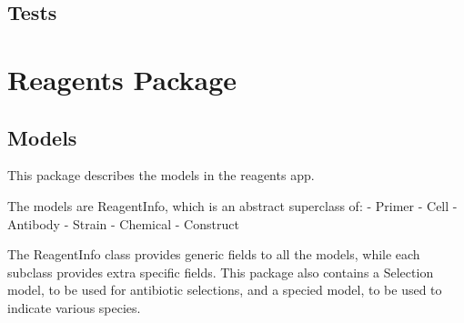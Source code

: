 \documentclass[letterpaper,10pt,english]{sphinxmanual}
\begin{document}
\subsection{Tests}
\label{api:id17}

\section{Reagents Package}
\label{api:module-experimentdb.reagents}\label{api:reagents-package}

\subsection{Models}
\label{api:id18}\label{api:module-experimentdb.reagents.models}
This package describes the models in the reagents app.

The models are ReagentInfo, which is an abstract superclass of:
- Primer
- Cell
- Antibody
- Strain
- Chemical
- Construct

The ReagentInfo class provides generic fields to all the models, while each subclass provides extra specific fields.
This package also contains a Selection model, to be used for antibiotic selections, and a specied model, to be used to indicate various species.
\end{document}
